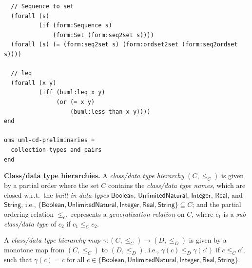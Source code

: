 \documentclass[10pt, a4paper]{isov2}
\newcommand{\uml}[1]{\textsf{#1}}
\begin{document}
\begin{lstlisting}
  // Sequence to set
  (forall (s)
          (if (form:Sequence s)
              (form:Set (form:seq2set s))))
  (forall (s) (= (form:seq2set s) (form:ordset2set (form:seq2ordset s))))

  // leq
  (forall (x y)
          (iff (buml:leq x y)
               (or (= x y)
                   (buml:less-than x y))))
end

oms uml-cd-preliminaries =
  collection-types and pairs
end
\end{lstlisting}




\textbf{Class/data type hierarchies.}  A \emph{class/data type
  hierarchy} $(C, {\leq_C})$
is given by a partial order where the set $C$
contains the \emph{class/data type names}, which are closed w.r.t.\ the
\emph{built-in data types} $\mathsf{Boolean}$,
$\mathsf{UnlimitedNatural}$,
$\mathsf{Integer}$,
$\mathsf{Real}$,
and $\mathsf{String}$,
i.e.,
$\{ \mathsf{Boolean}, \mathsf{UnlimitedNatural},\allowbreak
\mathsf{Integer}, \mathsf{Real}, \mathsf{String} \} \subseteq C$;
and the partial ordering relation $\leq_C$ represents a
\emph{generalization relation} on $C$, where $c_1$ is a
\emph{sub-class/data type} of $c_2$ if $c_1 \leq_C c_2$.

A \emph{class/data type hierarchy map}
$\gamma : (C, {\leq_C}) \to (D, {\leq_D})$ is given by a monotone map
from $(C, {\leq_C})$ to $(D, {\leq_D})$, i.e.,
$\gamma(c) \leq_D \gamma(c')$ if $c \leq_C c'$, such that
$\gamma(c) = c$ for all
$c \in \{ \mathsf{Boolean},\allowbreak \mathsf{UnlimitedNatural},\allowbreak
\mathsf{Integer}, \mathsf{Real}, \mathsf{String} \}$.
\end{document}
